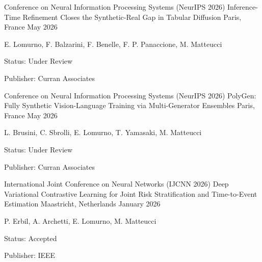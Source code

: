 \begin{cventries}
    \vspace{2mm}
    \cventry
        {Conference on Neural Information Processing Systems (NeurIPS 2026)} 
        {Inference-Time Refinement Closes the Synthetic-Real Gap in Tabular Diffusion}
        {Paris, France}
        {May 2026}
        {
        \begin{cvitems}
            \item {E. Lomurno, F. Balzarini, F. Benelle, F. P. Panaccione, M. Matteucci}
            \item {Status: Under Review}
            \item {Publisher: Curran Associates}
        \end{cvitems}
        }

    \vspace{2mm}
    \cventry
        {Conference on Neural Information Processing Systems (NeurIPS 2026)} 
        {PolyGen: Fully Synthetic Vision-Language Training via Multi-Generator Ensembles}
        {Paris, France}
        {May 2026}
        {
        \begin{cvitems}
            \item {L. Brusini, C. Sbrolli, E. Lomurno, T. Yamasaki, M. Matteucci}
            \item {Status: Under Review}
            \item {Publisher: Curran Associates}
        \end{cvitems}
        }

    \vspace{2mm}
    \cventry
        {International Joint Conference on Neural Networks (IJCNN 2026)} 
        {Deep Variational Contrastive Learning for Joint Risk Stratification and Time-to-Event Estimation}
        {Maastricht, Netherlands}
        {January 2026}
        {
        \begin{cvitems}
            \item {P. Erbil, A. Archetti, E. Lomurno, M. Matteucci}
            \item {Status: Accepted}
            \item {Publisher: IEEE}
        \end{cvitems}
        }


\end{cventries}
